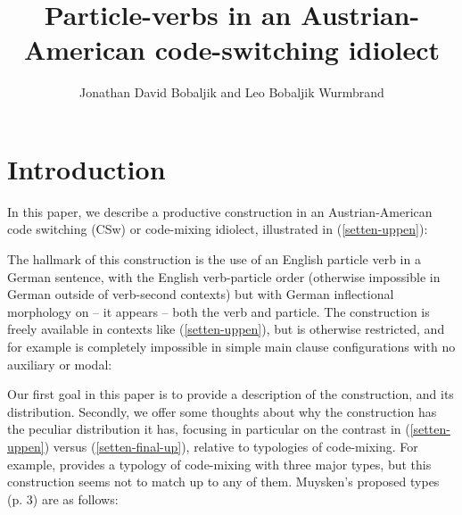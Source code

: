 \documentclass[output=paper]{langscibook}
\author{Jonathan David Bobaljik\affiliation{Harvard University} and Leo Bobaljik Wurmbrand\affiliation{Vienna, Austria}}
\title{Particle-verbs in an Austrian-American code-switching idiolect}
\begin{document}
\maketitle

\section{Introduction}
In this paper, we describe a productive construction in an Austrian-American code switching (CSw) or code-mixing idiolect, illustrated in (\ref{setten-uppen}):

\ea\label{setten-uppen}
\z
\z

The hallmark of this construction is the use of an English particle verb in a German sentence, with the English verb-particle order (otherwise impossible in German outside of verb-second contexts) but with German inflectional morphology on -- it appears -- both the verb and particle. The construction is freely available in contexts like (\ref{setten-uppen}), but is otherwise restricted, and for example is completely impossible in simple main clause configurations with no auxiliary or modal:

\ea\label{setten-final-up}
\z
\z 

Our first goal in this paper is to provide a description of the construction, and its distribution. Secondly, we offer some thoughts about why the construction has the peculiar distribution it has, focusing in particular on the contrast in (\ref{setten-uppen}) versus (\ref{setten-final-up}), relative to typologies of code-mixing. For example, \citet{muysken00} provides a typology of code-mixing with three major types, but this construction seems not to match up to any of them. Muysken's proposed types (p. 3) are as follows: 
\end{document}
